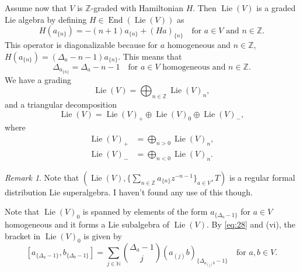 \documentclass[a4paper, 12pt, reqno]{amsart}
\theoremstyle{remark}
\newtheorem{remark}[theorem]{Remark}
\numberwithin{equation}{subsection}
\DeclareMathOperator{\End}{End}
\DeclareMathOperator{\Lie}{Lie}
\begin{document}
Assume now that $V$ is $\mathbb{Z}$-graded with Hamiltonian $H$.
Then $\Lie(V)$ is a graded Lie algebra by defining $H \in \End(\Lie(V))$ as
\begin{equation*}
  H(a_{\{n\}}) = -(n + 1)a_{\{n\}} + (Ha)_{\{n\}} \quad \text{for }a \in V\text{ and }n \in \mathbb{Z}.
\end{equation*}
This operator is diagonalizable because for $a$ homogeneous and $n \in \mathbb{Z}$, $H(a_{\{n\}}) = (\Delta_a - n - 1)a_{\{n\}}$.
This means that
\begin{equation*}
  \Delta_{a_{\{n\}}} = \Delta_a - n - 1\quad \text{for }a \in V\text{ homogeneous and }n \in \mathbb{Z}.
\end{equation*}
We have a grading
\begin{equation*}
  \Lie(V) = \bigoplus_{n \in \mathbb{Z}}\Lie(V)_n,
\end{equation*}
and a triangular decomposition
\begin{equation*}
  \Lie(V) = \Lie(V)_+ \oplus \Lie(V)_0 \oplus \Lie(V)_-,
\end{equation*}
where
\begin{align*}
  \Lie(V)_+ &= \bigoplus_{n > 0}\Lie(V)_n, \\
  \Lie(V)_- &= \bigoplus_{n < 0}\Lie(V)_n.
\end{align*}

\begin{remark}
  \label{rmk:22}
  Note that $(\Lie(V), \{\sum_{n \in \mathbb{Z}}a_{\{n\}}z^{-n - 1}\}_{a \in V}, T)$ is a regular formal distribution Lie superalgebra.
  I haven't found any use of this though.
\end{remark}

Note that $\Lie(V)_0$ is spanned by elements of the form $a_{\{\Delta_a - 1\}}$ for $a \in V$ homogeneous and it forms a Lie subalgebra of $\Lie(V)$.
By \eqref{eq:28} and (vi), the bracket in $\Lie(V)_0$ is given by
\begin{equation}
  \label{eq:29}
  [a_{\{\Delta_a - 1\}}, b_{\{\Delta_b - 1\}}] = \sum_{j \in \mathbb{N}}\binom{\Delta_a - 1}{j}(a_{(j)}b)_{\{\Delta_{a_{(j)}b} - 1\}}\quad \text{for }a, b \in V.
\end{equation}
\end{document}
